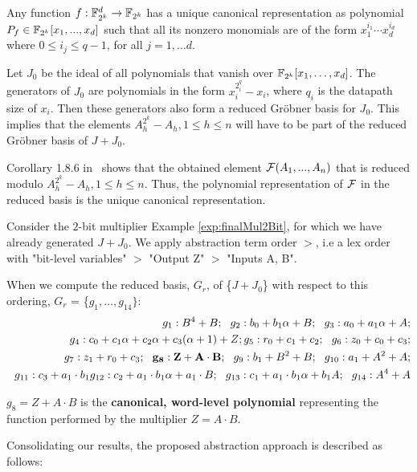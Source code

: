 \begin{Proof}
Any function $f: {\mathbb{F}}_{2^k}^d \to {\mathbb{F}}_{2^k}$ has a unique canonical 
representation as polynomial $P_f \in {\mathbb{F}}_{2^k}[x_1, ..., x_d]$ such that all 
its nonzero monomials are of the form $x_1^{i_1}\cdots x_d^{i_d}$ where $0 
\leq i_j \leq q-1$, for all $j=1, \ldots d$.

Let $J_0$ be the 
ideal of all polynomials that vanish over ${\mathbb{F}}_{2^k}[x_1, \ldots, x_d]$.
The generators of $J_0$ are polynomials in the form $x_i^{2^q_i}-x_i$,
where $q_i$ is the datapath size of $x_i$.
Then these generators also form a reduced Gr\"obner basis for $J_0$.
This implies that the elements $A_h^{2^k}-A_h, 1 \leq h \leq n$ will 
have to be part of the reduced Gr\"obner basis of $J+J_0$.

Corollary 1.8.6 in~\cite{gb_book} shows that the obtained element ${\mathcal{F}}
(A_1,..., A_n)$ that is reduced modulo
$A_h^{2^k}-A_h, 1 \leq h \leq n$. Thus, the polynomial representation of 
${\mathcal{F}}$ in the reduced \Grobner basis is the unique canonical 
representation.
\end{Proof}

\begin{Example}
Consider the $2$-bit multiplier Example 
\ref{exp:finalMul2Bit}, for which we have already generated $J+J_0$. 
We apply abstraction term order $>$, i.e a lex order with
"bit-level variables" $>$ "Output Z" $>$ "Inputs A, B".

When we compute the reduced \Grobner basis, $G_r$, of \{$J + J_0$\} with 
respect to this ordering, $G_r$ = \{$g_1, \dots, g_{14}\}:$
\begin{align*}
g_1: B^4+B; 
~~g_2: b_0+b_1 \alpha + B; 
~~g_3: a_0+a_1 \alpha + A;  \nonumber \\
~~g_4: c_0+c_1 \alpha + c_2 \alpha + c_3(\alpha+1)+Z;
g_5: r_0+c_1+c_2; 
~~g_6: z_0+c_0+c_3; \nonumber \\
~~g_7: z_1+r_0+c_3; 
~~{\bf g_8: Z+A\cdot B};
~~g_9: b_1+B^2+B; 
~~g_{10}: a_1+A^2+A; \nonumber \\
~~g_{11}: c_3+a_1\cdot b_1
g_{12}: c_2+a_1\cdot b_1 \alpha + a_1 \cdot B; 
~~g_{13}: c_1+a_1\cdot b_1 \alpha +b_1 A; 
~~g_{14}: A^4+A  \nonumber
\end{align*}

$g_8=Z+A\cdot B$ is the {\bf canonical, word-level polynomial } 
representing the function performed by the multiplier $Z=A\cdot B$.
\end{Example}

Consolidating our results, the proposed abstraction approach is described
as follows: 

